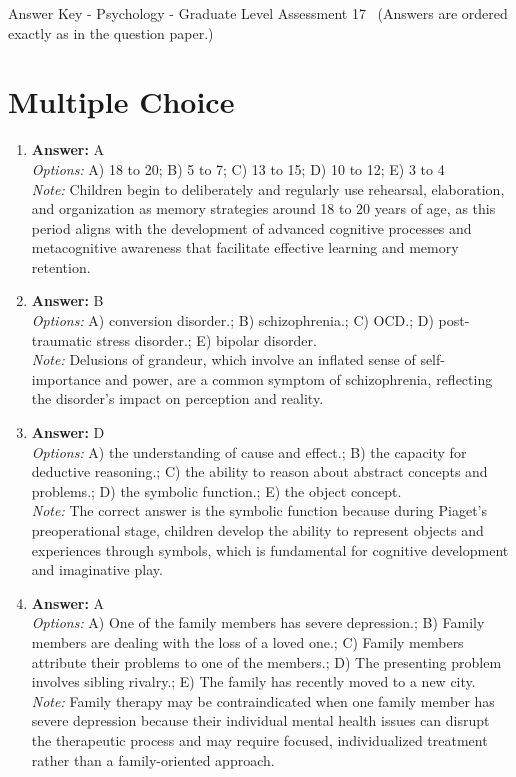 \documentclass[12pt]{article}
\begin{document}
\begin{center}
Answer Key - Psychology - Graduate Level Assessment 17 \
\small (Answers are ordered exactly as in the question paper.)
\end{center}

\section*{Multiple Choice}
\begin{enumerate}[label=\arabic*.]
\item \textbf{Answer:} A
\\ \textit{Options:} A) 18 to 20; B) 5 to 7; C) 13 to 15; D) 10 to 12; E) 3 to 4
\\ \textit{Note:} Children begin to deliberately and regularly use rehearsal, elaboration, and organization as memory strategies around 18 to 20 years of age, as this period aligns with the development of advanced cognitive processes and metacognitive awareness that facilitate effective learning and memory retention.
\item \textbf{Answer:} B
\\ \textit{Options:} A) conversion disorder.; B) schizophrenia.; C) OCD.; D) post-traumatic stress disorder.; E) bipolar disorder.
\\ \textit{Note:} Delusions of grandeur, which involve an inflated sense of self-importance and power, are a common symptom of schizophrenia, reflecting the disorder's impact on perception and reality.
\item \textbf{Answer:} D
\\ \textit{Options:} A) the understanding of cause and effect.; B) the capacity for deductive reasoning.; C) the ability to reason about abstract concepts and problems.; D) the symbolic function.; E) the object concept.
\\ \textit{Note:} The correct answer is the symbolic function because during Piaget's preoperational stage, children develop the ability to represent objects and experiences through symbols, which is fundamental for cognitive development and imaginative play.
\item \textbf{Answer:} A
\\ \textit{Options:} A) One of the family members has severe depression.; B) Family members are dealing with the loss of a loved one.; C) Family members attribute their problems to one of the members.; D) The presenting problem involves sibling rivalry.; E) The family has recently moved to a new city.
\\ \textit{Note:} Family therapy may be contraindicated when one family member has severe depression because their individual mental health issues can disrupt the therapeutic process and may require focused, individualized treatment rather than a family-oriented approach.

\end{enumerate}
\end{document}
